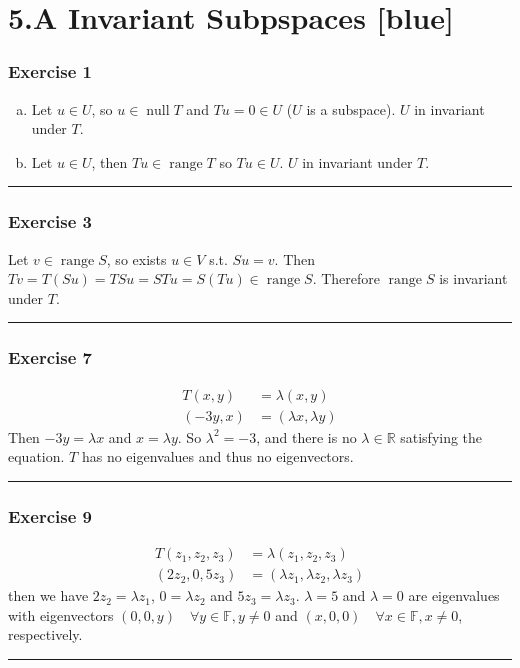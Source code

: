 \documentclass[12pt, letterpaper]{scrartcl}
\newcommand{\R}{\mathbb{R}}
\newcommand{\F}{\mathbb{F}}
\DeclareMathOperator{\Null}{null}
\DeclareMathOperator{\Range}{range}
\begin{document}
\section*{5.A Invariant Subpspaces \xrfill[2pt]{3pt}[blue]}
\subsubsection*{Exercise 1}
\begin{enumerate}[(a)]
    \item 
    Let $u\in U$, so $u\in\Null T$ and $Tu=0\in U$ ($U$ is a subspace). $U$ in invariant under $T$.
    
    \item 
    Let $u\in U$, then $Tu\in\Range T$ so $Tu\in U$. $U$ in invariant under $T$.
\end{enumerate}
\vskip1mm\hrule


\subsubsection*{Exercise 3}
Let $v\in\Range S$, so exists $u\in V$ s.t. $Su=v$. Then $Tv=T(Su)=TSu=STu=S(Tu)\in\Range S$. Therefore $\Range S$ is invariant under $T$.
\vskip1mm\hrule

\subsubsection*{Exercise 7}
\begin{align*}
    T(x, y)&=\lambda(x,y)\\
    (-3y,x)&=(\lambda x,\lambda y)
\end{align*}
Then $-3y=\lambda x$ and $x=\lambda y$. So $\lambda^2=-3$, and there is no $\lambda\in\R$ satisfying the equation. $T$ has no eigenvalues and thus no eigenvectors.
\vskip1mm\hrule

\subsubsection*{Exercise 9}
\begin{align*}
    T(z_1, z_2, z_3)&=\lambda(z_1, z_2, z_3)\\
    (2z_2, 0, 5z_3)&=(\lambda z_1,\lambda z_2, \lambda z_3)
\end{align*}
then we have $2z_2=\lambda z_1$, $0=\lambda z_2$ and $5z_3=\lambda z_3$. $\lambda=5$ and $\lambda=0$ are eigenvalues with eigenvectors $(0,0,y) \quad\forall y\in\F, y\neq0$ and $(x,0,0) \quad\forall x\in\F, x\neq0$, respectively. 
\vskip1mm\hrule
\end{document}
